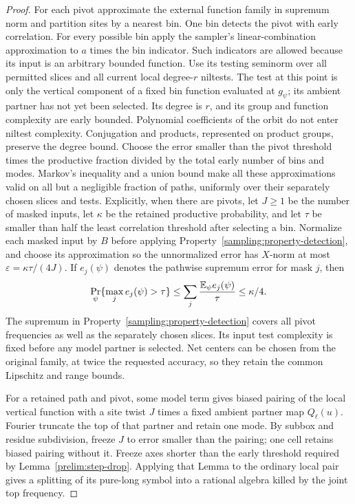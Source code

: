 \begin{proof}
For each pivot approximate the external function family in supremum
norm and partition sites by a nearest bin.  One bin detects the
pivot with early correlation.  For every possible bin apply the
sampler's linear-combination approximation to $a$ times the bin
indicator.  Such indicators are allowed because its input is an
arbitrary bounded function.  Use its testing seminorm over all
permitted slices and all current local degree-$r$ niltests.
The test at this point is only the vertical component of a fixed
bin function evaluated at $g_\psi$; its ambient partner has not yet
been selected.  Its degree is $r$, and its group and function
complexity are early bounded.  Polynomial coefficients of the orbit
do not enter niltest complexity.  Conjugation and products, represented
on product groups, preserve the degree bound.
Choose the error smaller than the pivot threshold times the
productive fraction divided by the total early number of bins and
modes.  Markov's inequality and a union bound make all these
approximations valid on all but a negligible fraction of paths,
uniformly over their separately chosen slices and tests.
Explicitly, when there are pivots, let $J\ge1$ be the number of masked inputs, let $\kappa$
be the retained productive probability, and let $\tau$ be smaller
than half the least correlation threshold after selecting a bin.
Normalize each masked input by $B$ before applying
Property~\ref{sampling:property-detection}, and
choose its approximation so the unnormalized error has $X$-norm
at most $\varepsilon=\kappa\tau/(4J)$.  If $e_j(\psi)$ denotes the
pathwise supremum error for mask $j$, then
\[
 \Pr_\psi\{\max_j e_j(\psi)>\tau\}
 \le \sum_j\frac{\mathbb E_\psi e_j(\psi)}{\tau}
 \le\kappa/4.
\]
The supremum in Property~\ref{sampling:property-detection} covers all pivot frequencies as well as
the separately chosen slices.  Its input test complexity is fixed
before any model partner is selected.  Net centers can be chosen
from the original family, at twice the requested accuracy, so they
retain the common Lipschitz and range bounds.

For a retained path and pivot, some model term gives biased pairing
of the local vertical function with a site twist $J$ times a fixed
ambient partner map $Q_\ell(u)$.  Fourier truncate the top of that
partner and retain one mode.  By subbox and residue subdivision,
freeze $J$ to error smaller than the pairing; one cell retains biased
pairing without it.  Freeze axes shorter than the early threshold
required by Lemma~\ref{prelim:step-drop}.  Applying that Lemma to the
ordinary local pair gives a splitting of its pure-long symbol into
a rational algebra killed by the joint top frequency.


\end{proof}
